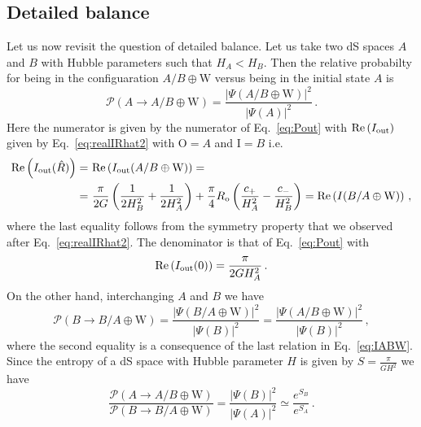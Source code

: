 \documentclass[11pt,a4paper]{article}
\begin{document}
\subsection{Detailed balance}

Let us now revisit the question of detailed balance. Let us take two
dS spaces $A$ and $B$ with Hubble parameters such that $H_A < H_B$. Then the relative probabilty for being in the configuaration $A/B \oplus \text{W}$ versus being in the initial state $A$ is 
\begin{equation}
\mathcal{P}(A \rightarrow A/B \oplus \text{W}) = \frac{|\Psi(A/B \oplus \text{W})|^{2}}{|\Psi(A)|^{2}}\,.\label{eq:PsiABW}
\end{equation}
Here the numerator is given by the numerator of Eq.~\eqref{eq:Pout} with $\text{Re}\left(I_{{\rm out}}\right)$ given by Eq.~\eqref{eq:realIRhat2} with $\text{O} = A$ and $\text{I} = B$ i.e. 
\begin{align}
\text{Re}\left(I_{{\rm out}}(\hat{R})\right) = \,\, & \text{Re}\left(I_{{\rm out}}(A/B \oplus \text{W}) \right) = \nonumber \\
= \,\, & \frac{\pi}{2G} \left(\frac{1}{2 H_B^{2}} + \frac{1}{2 H_A^{2}}\right) + \frac{\pi}{4}R_{\rm o}\left(\frac{c_{+}}{H_{A}^{2}} - \frac{c_{-}}{H_{B}^{2}}\right)= \text{Re}\left(I(B/A \oplus \text{W})\right) \,,\label{eq:IABW}
\end{align}
where the last equality follows from the symmetry property that we
observed after Eq.~\eqref{eq:realIRhat2}. The denominator is that of
Eq.~\eqref{eq:Pout} with 
\begin{equation}
\text{Re}\left(I_{{\rm out}}(0) \right) = \frac{\pi}{2 G H_{A}^{2}} \,.
\end{equation}
On the other hand, interchanging $A$ and $B$ we have 
\begin{equation}
\mathcal{P}(B \rightarrow B/A \oplus \text{W}) = \frac{|\Psi(B/A \oplus \text{W})|^{2}}{|\Psi(B)|^{2}} =\frac{|\Psi(A/B \oplus \text{W})|^{2}}{|\Psi(B)|^{2}} \,,\label{eq:PsiBAW}
\end{equation}
where the second equality is a consequence of the last relation in
Eq.~\eqref{eq:IABW}. Since the entropy of a dS space with Hubble parameter $H$ is given by $S = \frac{\pi}{G H^{2}}$ we have 
\begin{equation}
\frac{\mathcal{P}(A \rightarrow A/B \oplus \text{W})}{\mathcal{P}(B \rightarrow B/A \oplus \text{W})} = \frac{|\Psi(B)|^{2}}{|\Psi(A)|^{2}} \simeq \frac{e^{S_{B}}}{e^{S_{A}}} \,.\label{eq:SASB}
\end{equation}
\end{document}
